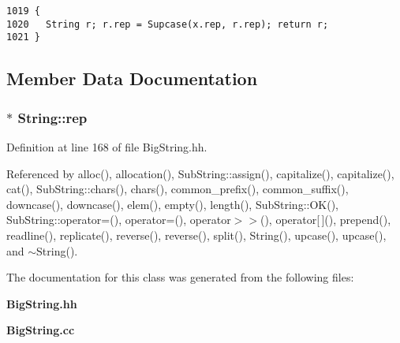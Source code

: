 \footnotesize\begin{verbatim}1019 {
1020   String r; r.rep = Supcase(x.rep, r.rep); return r;
1021 }
\end{verbatim}\normalsize 


\subsection{Member Data Documentation}
\subsubsection{$\ast$ String::rep\hspace{0.3cm}{\tt  [protected]}}\label{classString_n0}




Definition at line 168 of file Big\-String.hh.

Referenced by alloc(), allocation(), Sub\-String::assign(), capitalize(), capitalize(), cat(), Sub\-String::chars(), chars(), common\_\-prefix(), common\_\-suffix(), downcase(), downcase(), elem(), empty(), length(), Sub\-String::OK(), Sub\-String::operator=(), operator=(), operator$>$$>$(), operator[$\,$](), prepend(), readline(), replicate(), reverse(), reverse(), split(), String(), upcase(), upcase(), and $\sim$String().

The documentation for this class was generated from the following files:\begin{CompactItemize}
\item 
{\bf Big\-String.hh}\item 
{\bf Big\-String.cc}\end{CompactItemize}
